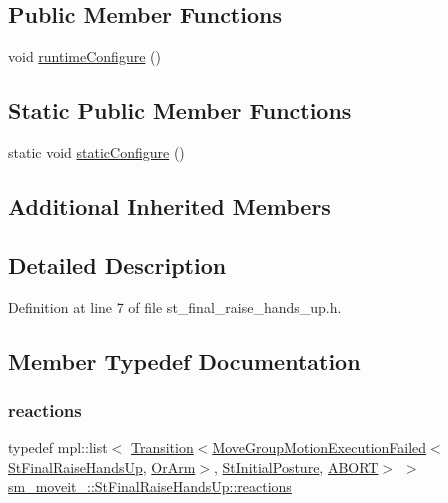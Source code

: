 \subsection*{Public Member Functions}
\begin{DoxyCompactItemize}
\item 
void \hyperlink{structsm__moveit__4_1_1StFinalRaiseHandsUp_abf2c776a0c87aca2f9bae83228f5c5a2}{runtime\+Configure} ()
\end{DoxyCompactItemize}
\subsection*{Static Public Member Functions}
\begin{DoxyCompactItemize}
\item 
static void \hyperlink{structsm__moveit__4_1_1StFinalRaiseHandsUp_aabce6ade1a08aa3de0a2cfc1f33810bb}{static\+Configure} ()
\end{DoxyCompactItemize}
\subsection*{Additional Inherited Members}


\subsection{Detailed Description}


Definition at line 7 of file st\+\_\+final\+\_\+raise\+\_\+hands\+\_\+up.\+h.



\subsection{Member Typedef Documentation}
\mbox{\label{structsm__moveit__4_1_1StFinalRaiseHandsUp_af12b19b5e2f0f5fc3bbe6e8cee4d9bb1}} 
\subsubsection{\texorpdfstring{reactions}{reactions}}
{\footnotesize\ttfamily typedef mpl\+::list$<$ \hyperlink{classsmacc_1_1Transition}{Transition}$<$\hyperlink{structmoveit__z__client_1_1MoveGroupMotionExecutionFailed}{Move\+Group\+Motion\+Execution\+Failed}$<$\hyperlink{structsm__moveit__4_1_1StFinalRaiseHandsUp}{St\+Final\+Raise\+Hands\+Up}, \hyperlink{classsm__moveit__4_1_1OrArm}{Or\+Arm}$>$, \hyperlink{structsm__moveit__4_1_1StInitialPosture}{St\+Initial\+Posture}, \hyperlink{structsmacc_1_1default__transition__tags_1_1ABORT}{A\+B\+O\+RT}$>$ $>$ \hyperlink{structsm__moveit__4_1_1StFinalRaiseHandsUp_af12b19b5e2f0f5fc3bbe6e8cee4d9bb1}{sm\+\_\+moveit\+\_\+::\+St\+Final\+Raise\+Hands\+Up\+::reactions}}



